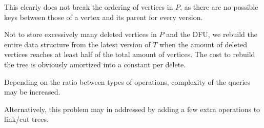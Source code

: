 This clearly does not break the ordering of vertices in $P$, as there are no possible keys between those of a vertex and its parent for every version. 
 
Not to store excessively many deleted vertices in $P$ and the DFU, we rebuild the entire data structure from the latest version of $T$ when the amount of deleted vertices reaches at least half of the total amount of vertices. The cost to rebuild the tree is obviously amortized into a constant per delete.
 
Depending on the ratio between types of operations, complexity of the queries may be increased. %

Alternatively, this problem may in addressed by adding a few extra operations to link/cut trees\cite{link-cut}.

